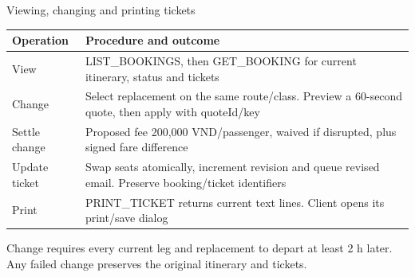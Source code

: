 \documentclass[t,aspectratio=169]{beamer}
\newcommand{\gap}{\par\vspace{0.18cm}}
\begin{document}
\begin{frame}{Viewing, changing and printing tickets}
\small
\begin{tabularx}{\textwidth}{@{}lY@{}}
\toprule
\textbf{Operation} & \textbf{Procedure and outcome}\\
\midrule
View & LIST\_BOOKINGS, then GET\_BOOKING for current itinerary, status and tickets\\
Change & Select replacement on the same route/class. Preview a 60-second quote, then apply with quoteId/key\\
Settle change & Proposed fee 200,000 VND/passenger, waived if disrupted, plus signed fare difference\\
Update ticket & Swap seats atomically, increment revision and queue revised email. Preserve booking/ticket identifiers\\
Print & PRINT\_TICKET returns current text lines. Client opens its print/save dialog\\
\bottomrule
\end{tabularx}
\gap
Change requires every current leg and replacement to depart at least 2 h later. Any failed change preserves the original itinerary and tickets.
\end{frame}
\end{document}
